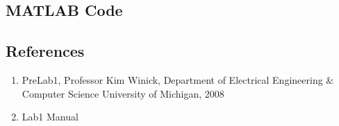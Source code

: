 \documentclass{article}
\begin{document}
\subsection{MATLAB Code}
\begin{minipage}{0.02\linewidth}
\phantom{1}
\end{minipage}
\begin{minipage}{0.9\linewidth}
\end{minipage}

\subsection{References}
\begin{enumerate}
	\item PreLab1, Professor Kim Winick, Department of Electrical Engineering \& Computer Science University of Michigan, 2008
	\item Lab1 Manual
\end{enumerate}
\end{document}
